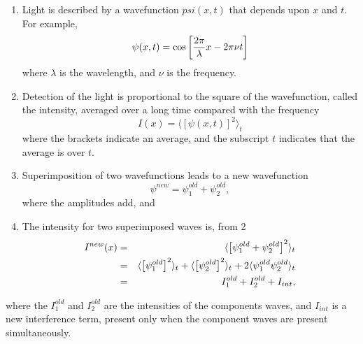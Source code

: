 \begin{enumerate}
\item Light is described by a wavefunction $psi(x,t)$ that depends 
upon $x$ and $t$.  For example,
\begin{equation}
\psi (x,t) = \cos \left[ {2 \pi \over \lambda} x - 2 \pi \nu t \right]
\end{equation}
where $\lambda$ is the wavelength, and $\nu$ is the frequency.

\item Detection of the light is proportional to the square of the 
wavefunction, called the intensity, averaged over a long time compared with 
the frequency
\begin{equation}
I(x) = \langle \left[ \psi (x,t) \right]^2 \rangle_t
\end{equation}
where the brackets indicate an average, and the subscript $t$ 
indicates that the average is over $t$.

\item Superimposition of two wavefunctions leads to a new wavefunction
\begin{equation}
\psi^{new} = \psi^{old}_1 + \psi^{old}_2,
\end{equation}
where the amplitudes add, and

\item The intensity for two superimposed waves is, from 2
\begin{eqnarray}
I^{new}(x) &=& \langle \left[ \psi^{old}_1 + \psi^{old}_2 \right]^2 \rangle_t\cr
&=& \langle \left[ \psi^{old}_1 \right]^2 \rangle_t + \langle \left[ \psi^{old}_2 \right]^2 \rangle_t + 
2 \langle \psi^{old}_1 \psi^{old}_2 \rangle_t\cr
&=& I^{old}_1 + I^{old}_2 + I_{int},
\end{eqnarray}

\end{enumerate}
\noindent
where the $I^{old}_1$ and $I^{old}_2$ are the intensities of the components 
waves, and $I_{int}$ is a new
interference term, present only when the component waves are present
simultaneously.

